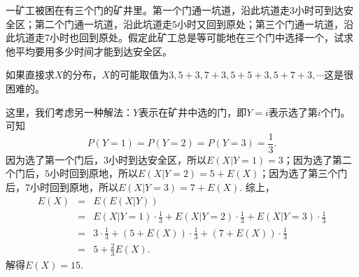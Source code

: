 \begin{example}
    一矿工被困在有三个门的矿井里。第一个门通一坑道，沿此坑道走3小时可到达安全区；第二个门通一坑道，沿此坑道走5小时又回到原处；第三个门通一坑道，沿此坑道走7小时也回到原处。假定此矿工总是等可能地在三个门中选择一个，试求他平均要用多少时间才能到达安全区。
    \vspace{5cm}
\end{example}
\begin{solution}
如果直接求$X$的分布，$X$的可能取值为$3,5+3,7+3,5+5+3,5+7+3,\cdots$这是很困难的。

这里，我们考虑另一种解法：$Y$表示在矿井中选的门，即${Y=i}$表示选了第$i$个门。可知$$P(Y=1)=P(Y=2)=P(Y=3)=\frac{1}{3}.$$
因为选了第一个门后，$3$小时到达安全区，所以$E(X |  Y=1)=3$；因为选了第二个门后，$5$小时回到原地，所以$E(X |  Y=2)=5+E(X)$；因为选了第三个门后，$7$小时回到原地，所以$E(X |  Y=3)=7+E(X)$.
综上，
\begin{eqnarray*}
E(X) &=&E(E(X  |  Y)) \\
&=&E(X  |  Y=1) \cdot \frac{1}{3}+E(X  |  Y=2) \cdot \frac{1}{3}+E(X  |  Y=3) \cdot \frac{1}{3} \\
&=&3 \cdot \frac{1}{3}+(5+E(X)) \cdot \frac{1}{3}+(7+E(X)) \cdot \frac{1}{3} \\
&=& 5 +\frac{2}{3} E(X).
\end{eqnarray*}
解得$E(X)=15$.
\end{solution}

